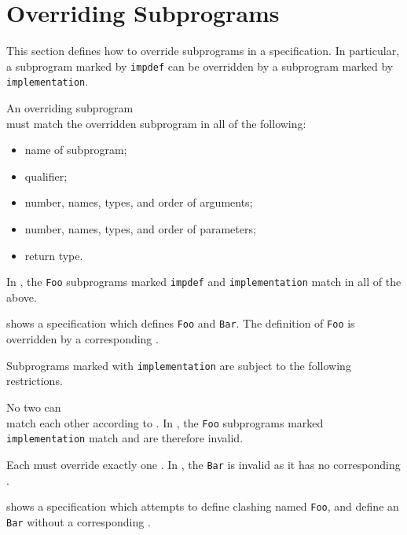 \section{Overriding Subprograms\label{sec:Overriding Subprograms}}
This section defines how to override subprograms in a specification.
In particular, a subprogram marked by \texttt{impdef} can be overridden by a subprogram marked by \\
\texttt{implementation}.

An overriding \Proseimplementationsubprogram{} subprogram \\
must match the overridden \Proseimpdefsubprogram{} subprogram in all of the following:
\begin{itemize}
  \item name of subprogram;
  \item qualifier;
  \item number, names, types, and order of arguments;
  \item number, names, types, and order of parameters;
  \item return type.
\end{itemize}
In , the \verb|Foo| subprograms marked \texttt{impdef} and \texttt{implementation} match in all of the above.

 shows a specification which defines \Proseimpdefsubprograms{} \verb|Foo| and \verb|Bar|.
The definition of \verb|Foo| is overridden by a corresponding \Proseimplementationsubprogram{}.

\noindent
Subprograms marked with \texttt{implementation} are subject to the following restrictions.

No two \Proseimplementationsubprograms{} can \\
match each other according to .
In , the \verb|Foo| subprograms marked \texttt{implementation}
match and are therefore invalid.

Each \Proseimplementationsubprogram{} must override exactly one \Proseimpdefsubprogram.
In , the \Proseimplementationsubprogram{} \verb|Bar| is
invalid as it has no corresponding \Proseimpdefsubprogram{}.

 shows a specification which attempts to define clashing
\Proseimplementationsubprograms{} named \verb|Foo|, and define an
\Proseimplementationsubprogram{} \verb|Bar| without a corresponding \Proseimpdefsubprogram{}.

